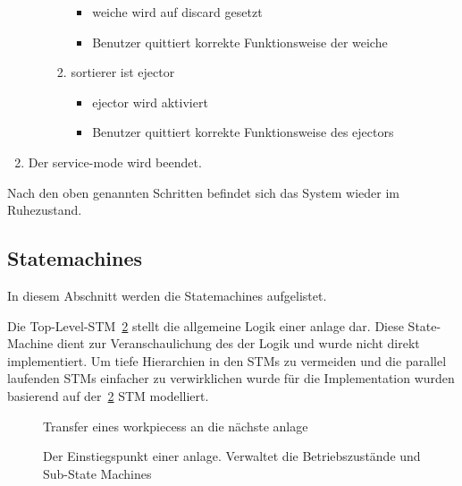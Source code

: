 \begin{enumerate}
\begin{enumerate}
\begin{enumerate}
\begin{itemize}
                \item \gls{weiche} wird auf \gls{discard} gesetzt
                \item Benutzer quittiert korrekte Funktionsweise der \gls{weiche}
            \end{itemize}
            \item \gls{sortierer} ist \gls{ejector}
            \begin{itemize}
                \item \Gls{ejector} wird aktiviert
                \item Benutzer quittiert korrekte Funktionsweise des \gls{ejector}s
            \end{itemize}
        \end{enumerate}
    \end{enumerate}
    \item Der \gls{service-mode} wird beendet.
\end{enumerate}
Nach den oben genannten Schritten befindet sich das System wieder im Ruhezustand.

\clearpage
\subsection{Statemachines}\label{subsec:stm}
In diesem Abschnitt werden die Statemachines aufgelistet.

Die Top-Level-STM~\ref{fig:stm_top_level} stellt die allgemeine Logik einer \gls{anlage} dar.
Diese State-Machine dient zur Veranschaulichung des der Logik und wurde nicht direkt implementiert.
Um tiefe Hierarchien in den STMs zu vermeiden und die parallel laufenden STMs einfacher zu verwirklichen wurde
für die Implementation wurden basierend auf der~\ref{fig:stm_top_level} STM modelliert.

\begin{figure}[h]
    \caption{Transfer eines \glspl{workpiece}s an die nächste \gls{anlage}}
    \label{fig:stm_workpiece_transfer}
\end{figure}

\begin{figure}
    \caption{Der Einstiegspunkt einer \gls{anlage}.
    Verwaltet die Betriebszustände und Sub-State Machines}
    \label{fig:stm_top_level}
\end{figure}

